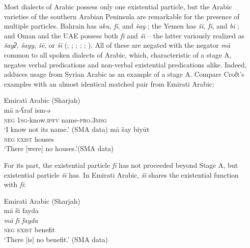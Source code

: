 \documentclass[output=paper]{langsci/langscibook}
\begin{document}
Most dialects of Arabic possess only one existential particle, but the Arabic varieties of the southern Arabian Peninsula are remarkable for the presence of multiple particles. Bahrain has \textit{aku, fī}, and \textit{šay} \citep[110]{holes2016a}; the Yemen has \textit{šī, fī}, and \textit{bī} \citep[346–348, maps 136 \& 137]{behnstedt2016a}; and Oman and the UAE possess both \textit{fī} and \textit{šī} – the latter variously realized as \textit{šayʔ, šayy, šē}, or \textit{šī} (\citealp[112]{reinhardt1894a}; \citealp[170]{johnstone1967a}; \citealp[24]{brockett1985a}; \citealp[71]{holes1990a}; \citealp[24--28]{holes2016a}; \citealp[162]{davey2016a}). All of these are negated with the negator \textit{mā} common to all spoken dialects of Arabic, which, characteristic of a stage A, negates verbal predications and non-verbal existential predications alike. Indeed, \citep[7]{Croft1991} adduces usage from Syrian Arabic as an example of a stage A. Compare Croft’s examples with an almost identical matched pair from Emirati Arabic:

\ea Emirati Arabic (Sharjah)\label{ex:WiAR-11}\\
  \ea
  	\gll mā a-ʕraf ism-ǝ\\
  	\textsc{neg} \textsc{1sg}-know.\textsc{ipfv} name-\textsc{pro.3msg}\\
  	\glt ‘I know not its name.’ (SMA data)
  \ex
  	\gll mā šay biyūt\\
  	\textsc{neg} \textsc{exist} houses \\
  	\glt ‘There [were] no houses.’(SMA data)
\z \z

For its part, the existential particle \textit{fī} has not proceeded beyond Stage A, but existential particle \textit{šī} has. In Emirati Arabic, \textit{šī} shares the existential function with \textit{fī}:

\ea Emirati Arabic (Sharjah)\label{ex:WiAR-12}\\
	\glll mā šī fayda\\
	\textit{mā} \textit{fī} \textit{fayda}\\
	\textsc{neg} \textsc{exist} benefit\\
	\glt ‘There [is] no benefit.’ (SMA data)
\z
\end{document}

